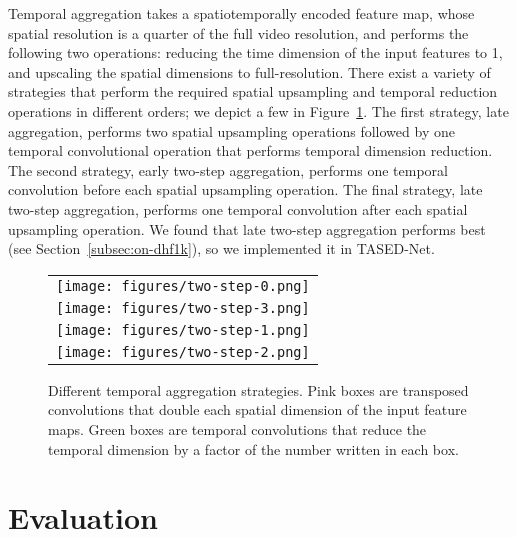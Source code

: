 \documentclass[10pt,twocolumn,letterpaper]{article}
\newcommand{\modelname}{TASED-Net}
\begin{document}
Temporal aggregation takes a spatiotemporally encoded feature map, whose spatial resolution is a quarter of the full video resolution, and performs the following two operations: reducing the time dimension of the input features to 1, and upscaling the spatial dimensions to full-resolution. There exist a variety of strategies that perform the required spatial upsampling and temporal reduction operations in different orders; we depict a few in Figure~\ref{fig:agg}. The first strategy, late aggregation, performs two spatial upsampling operations followed by one temporal convolutional operation that performs temporal dimension reduction. The second strategy, early two-step aggregation, performs one temporal convolution before each spatial upsampling operation. The final strategy, late two-step aggregation, performs one temporal convolution after each spatial upsampling operation. We found that late two-step aggregation performs best (see Section~\ref{subsec:on-dhf1k}), so we implemented it in \modelname{}.



\begin{figure}\centering\begin{tabular}{c}
\hspace{1em}\texttt{[image: figures/two-step-0.png]}\\[1ex]
\raisebox{1.5\height}{\makebox[3em]{(a)\hspace{4.55em}}}\texttt{[image: figures/two-step-3.png]}\\[1ex]
\raisebox{1.5\height}{\makebox[3em]{(b)\hspace{2.4em}}}\texttt{[image: figures/two-step-1.png]}\\[1ex]
\raisebox{1.5\height}{\makebox[3em]{(c)\hspace{2.31em}}}\texttt{[image: figures/two-step-2.png]}\\[0.2ex]
\end{tabular}
\caption{Different temporal aggregation strategies. Pink boxes are transposed convolutions that double each spatial dimension of the input feature maps. Green boxes are temporal convolutions that reduce the temporal dimension by a factor of the number written in each box.}
\label{fig:agg}\end{figure} 
\section{Evaluation} \label{sec:eval}
\end{document}
